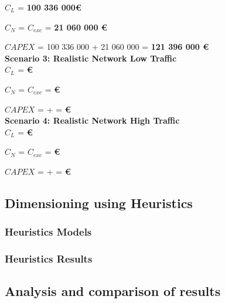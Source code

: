 $C_L$ = \textbf{100 336 000\euro}

$C_N$ = $C_{exc}$ = \textbf{21 060 000 \euro}

$CAPEX$ = 100 336 000 + 21 060 000 = \textbf{121 396 000 \euro}\\


\textbf{Scenario 3: Realistic Network Low Traffic} \label{Scenario3_opaque} \\

$C_L$ = \textbf{\euro}

$C_N$ = $C_{exc}$ = \textbf{\euro}

$CAPEX$ =  +  = \textbf{\euro}\\

\textbf{Scenario 4: Realistic Network High Traffic} \label{Scenario4_opaque} \\

$C_L$ = \textbf{\euro}

$C_N$ = $C_{exc}$ = \textbf{ \euro}

$CAPEX$ =  +  = \textbf{ \euro}\\

\subsection{Dimensioning using Heuristics}

\subsubsection{Heuristics Models}

\subsubsection{Heuristics Results}

\subsection{Analysis and comparison of results}
